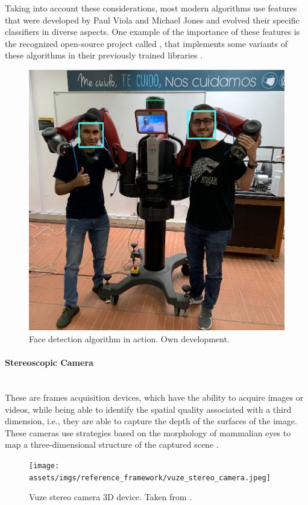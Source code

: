\documentclass[11pt]{report} %
\newcommand{\subsubsubsection}[1]{\paragraph{#1}\mbox{}\\}
\begin{document}
Taking into account these considerations, most modern algorithms use features that were developed by Paul Viola and Michael Jones and evolved their specific classifiers in diverse aspects. One example of the importance of these features is the recognized open-source project called , that implements some variants of these algorithms in their previously trained  libraries \citep{cite_opencv_classifier_face_detection_general}.\\



\begin{figure}[H]
    \centering
    \includegraphics[width=0.8\linewidth]{assets/imgs/reference_framework/face_detection_example_us.png}
    \caption{Face detection algorithm in action. Own development.}
    \label{fig_face_detection_us_with_baxter}
\end{figure}


\subsubsubsection{Stereoscopic Camera}

These are frames acquisition devices, which have the ability to acquire images or videos, while being able to identify the spatial quality associated with a third dimension, i.e., they are able to capture the depth of the surfaces of the image. These cameras use strategies based on the morphology of mammalian eyes to map a three-dimensional structure of the captured scene \citep{cite_stereoscopic_camera_techniques}.\\

\begin{figure}[H]
    \centering
    \texttt{[image: assets/imgs/reference\_framework/vuze\_stereo\_camera.jpeg]}
    \caption{Vuze stereo camera 3D device. Taken from \citep{cite_photo_vuze_stereo_camera_device}.} 
    \label{fig_vuz_stereo_camera_device}
\end{figure}
\end{document}
